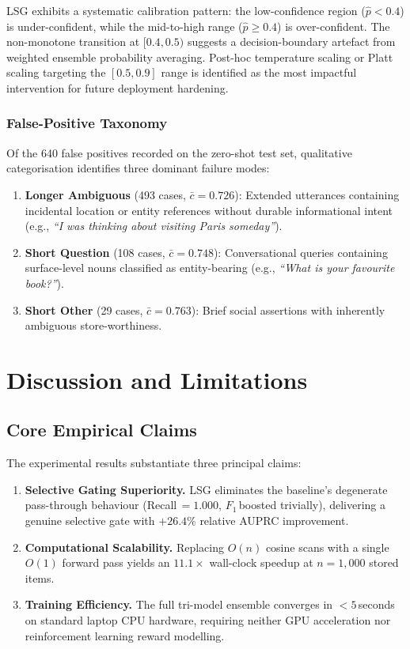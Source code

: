 \documentclass[conference]{IEEEtran}
\begin{document}
LSG exhibits a systematic calibration pattern: the
low-confidence region ($\hat{p} < 0.4$) is under-confident,
while the mid-to-high range ($\hat{p} \geq 0.4$) is
over-confident.
The non-monotone transition at $[0.4, 0.5)$ suggests a
decision-boundary artefact from weighted ensemble probability
averaging.
Post-hoc temperature scaling or Platt scaling targeting the
$[0.5, 0.9]$ range is identified as the most impactful
intervention for future deployment hardening.

\subsubsection{False-Positive Taxonomy}
Of the 640 false positives recorded on the zero-shot test
set, qualitative categorisation identifies three dominant
failure modes:
\begin{enumerate}
  \item \textbf{Longer Ambiguous} (493 cases,
    $\bar{c}{=}0.726$): Extended utterances containing
    incidental location or entity references without
    durable informational intent
    (e.g., \emph{``I was thinking about visiting Paris
    someday''}).
  \item \textbf{Short Question} (108 cases,
    $\bar{c}{=}0.748$): Conversational queries containing
    surface-level nouns classified as entity-bearing
    (e.g., \emph{``What is your favourite book?''}).
  \item \textbf{Short Other} (29 cases,
    $\bar{c}{=}0.763$): Brief social assertions with
    inherently ambiguous store-worthiness.
\end{enumerate}

\section{Discussion and Limitations}

\subsection{Core Empirical Claims}
The experimental results substantiate three principal claims:
\begin{enumerate}
  \item \textbf{Selective Gating Superiority.}
    LSG eliminates the baseline's degenerate pass-through
    behaviour (Recall\,$=1.000$, $F_1$\,boosted trivially),
    delivering a genuine selective gate with $+26.4\%$
    relative AUPRC improvement.
  \item \textbf{Computational Scalability.}
    Replacing $O(n)$ cosine scans with a single $O(1)$
    forward pass yields an $11.1{\times}$ wall-clock
    speedup at $n{=}1{,}000$ stored items.
  \item \textbf{Training Efficiency.}
    The full tri-model ensemble converges in $<5$\,seconds
    on standard laptop CPU hardware, requiring neither
    GPU acceleration nor reinforcement learning reward
    modelling.
\end{enumerate}
\end{document}
